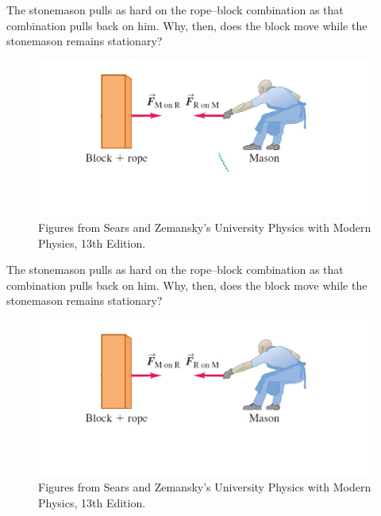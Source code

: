 \documentclass[]{beamer}
\begin{document}

 

    \begin{frame}
      The stonemason pulls as hard on the rope–block combination as that combination pulls
      back on him. Why, then, does the block move while the stonemason  remains stationary?
      
      \vspace{5mm}
    

      \begin{figure}[h!]  
        \includegraphics[width=1.\textwidth]{images/f14.jpg}
        \caption{ {\tiny Figures from Sears and Zemansky's University Physics 
        with Modern Physics, 13th Edition.} }
      \end{figure}

      \end{frame}





 

    \begin{frame}
      The stonemason pulls as hard on the rope–block combination as that combination pulls
      back on him. Why, then, does the block move while the stonemason  remains stationary?
      
      \vspace{5mm}
    

      \begin{figure}[h!]  
        \includegraphics[width=1.\textwidth]{images/f15.jpg}
        \caption{ {\tiny Figures from Sears and Zemansky's University Physics 
        with Modern Physics, 13th Edition.} }
      \end{figure}

      \end{frame}
\end{document}
